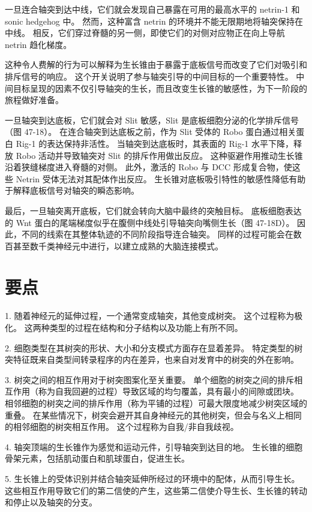 一旦连合轴突到达中线，它们就会发现自己暴露在可用的最高水平的 netrin-1 和 sonic hedgehog 中。 然而，这种富含 netrin 的环境并不能无限期地将轴突保持在中线。 相反，它们穿过脊髓的另一侧，即使它们的对侧对应物正在向上导航 netrin 趋化梯度。

这种令人费解的行为可以解释为生长锥由于暴露于底板信号而改变了它们对吸引和排斥信号的响应。 这个开关说明了参与轴突引导的中间目标的一个重要特性。 中间目标呈现的因素不仅引导轴突的生长，而且改变生长锥的敏感性，为下一阶段的旅程做好准备。

一旦轴突到达底板，它们就会对 Slit 敏感，Slit 是底板细胞分泌的化学排斥信号（图 47-18）。 在连合轴突到达底板之前，作为 Slit 受体的 Robo 蛋白通过相关蛋白 Rig-1 的表达保持非活性。 当轴突到达底板时，其表面的 Rig-1 水平下降，释放 Robo 活动并导致轴突对 Slit 的排斥作用做出反应。 这种驱避作用推动生长锥沿着狭缝梯度进入脊髓的对侧。 此外，激活的 Robo 与 DCC 形成复合物，使这些 Netrin 受体无法对其配体作出反应。 生长锥对底板吸引特性的敏感性降低有助于解释底板信号对轴突的瞬态影响。

最后，一旦轴突离开底板，它们就会转向大脑中最终的突触目标。 底板细胞表达的 Wnt 蛋白的尾端梯度似乎在腹侧中线处引导轴突向嘴侧生长（图 47-18D）。 因此，不同的线索在其整体轨迹的不同阶段指导连合轴突。 同样的过程可能会在数百甚至数千类神经元中进行，以建立成熟的大脑连接模式。


\section{要点}
1. 随着神经元的延伸过程，一个通常变成轴突，其他变成树突。 这个过程称为极化。 这两种类型的过程在结构和分子结构以及功能上有所不同。 

2. 细胞类型在其树突的形状、大小和分支模式方面存在显着差异。 特定类型的树突特征既来自类型间转录程序的内在差异，也来自对发育中的树突的外在影响。 

3. 树突之间的相互作用对于树突图案化至关重要。 单个细胞的树突之间的排斥相互作用（称为自我回避的过程）导致区域的均匀覆盖，具有最小的间隙或团块。 相邻细胞的树突之间的排斥作用（称为平铺的过程）可最大限度地减少树突区域的重叠。 在某些情况下，树突会避开其自身神经元的其他树突，但会与名义上相同的相邻细胞的树突相互作用。 这个过程称为自我/非自我歧视。 

4. 轴突顶端的生长锥作为感觉和运动元件，引导轴突到达目的地。 生长锥的细胞骨架元素，包括肌动蛋白和肌球蛋白，促进生长。 

5. 生长锥上的受体识别并结合轴突延伸所经过的环境中的配体，从而引导生长。 这些相互作用导致它们的第二信使的产生，这些第二信使介导生长、生长锥的转动和停止以及轴突的分支。 

